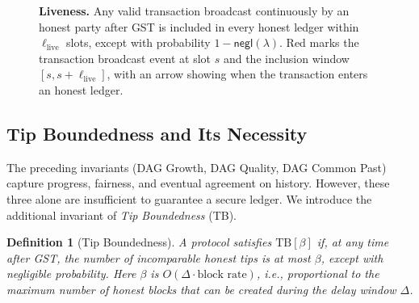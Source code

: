 \documentclass[11pt]{article}
\newtheorem{definition}[theorem]{Definition}
\newcommand{\negl}{\ensuremath{\mathsf{negl}}\xspace}
\newcommand{\tx}{\ensuremath{\mathtt{tx}}\xspace}
\begin{document}
\begin{figure}[htp!]
\centering
{}
\caption{\textbf{Liveness.} 
\small
Any valid transaction broadcast continuously by an honest party after GST is included in every honest ledger within $\ell_{\mathrm{live}}$ slots, except with probability $1-\negl(\lambda)$. 
Red marks the transaction broadcast event at slot $s$ and the inclusion window $[s,s+\ell_{\mathrm{live}}]$, with an arrow showing when the transaction enters an honest ledger.}

\label{fig:liveness}
\end{figure}





\subsection{Tip Boundedness and Its Necessity}
\label{subsec:tip-boundedness}

The preceding invariants (DAG Growth, DAG Quality, DAG Common Past) capture progress, fairness, and eventual agreement on history. However, these three alone are insufficient to guarantee a secure ledger. We introduce the additional invariant of \emph{Tip Boundedness} (TB).

\begin{definition}[Tip Boundedness]
A protocol satisfies $\mathrm{TB}[\beta]$ if, at any time after GST, the number of incomparable honest tips is at most $\beta$, except with negligible probability. 
Here $\beta$ is $O(\Delta \cdot \text{block rate})$, i.e., proportional to the maximum number of honest blocks that can be created during the delay window $\Delta$.
\end{definition}
\end{document}
